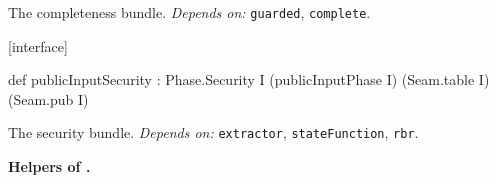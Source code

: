 The completeness bundle. \emph{Depends on:} \texttt{guarded}, \texttt{complete}.

\par\medskip\noindent\textbf{}\hfill\textsf{\small [interface]}\par\nopagebreak

\begin{leancode}
def publicInputSecurity : Phase.Security I (publicInputPhase I) (Seam.table I) (Seam.pub I)
\end{leancode}


The security bundle. \emph{Depends on:} \texttt{extractor}, \texttt{stateFunction}, \texttt{rbr}.

\par\medskip\noindent\textbf{Helpers of .}

